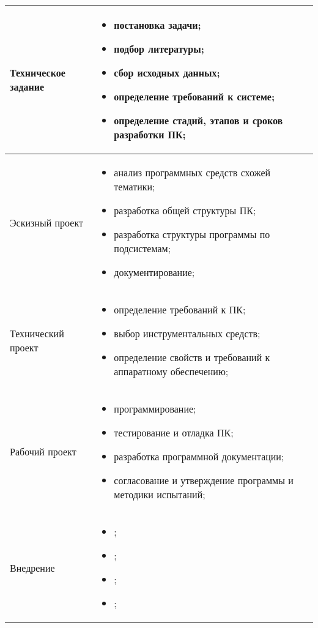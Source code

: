 \begin{center}
\begin{longtable}{|l|l|}
\hline
\endlastfoot
		Техническое задание & \begin{parbox}{5in} {
						\begin{itemize}
							\item постановка задачи;
							\item подбор литературы;
							\item сбор исходных данных;
							\item определение требований к системе;
							\item определение стадий, этапов и сроков разработки ПК;
						\end{itemize} }  
					\end{parbox} \\
	\hline
		Эскизный проект & \begin{parbox}{5in} {
					\begin{itemize} 
						\item анализ программных средств схожей тематики;
						\item разработка общей структуры ПК;
						\item разработка структуры программы по подсистемам;
						\item документирование;
					\end{itemize} }
				\end{parbox} \\
	\hline
		Технический проект & \begin{parbox}{5in} {
					\begin{itemize} 
						\item определение требований к ПК;
						\item выбор инструментальных средств;
						\item определение свойств и требований к аппаратному обеспечению;
					\end{itemize} } 
				\end{parbox} \\
	\hline
		Рабочий проект & \begin{parbox}{5in} {
					\begin{itemize} 
						\item программирование;
						\item тестирование и отладка ПК;
						\item разработка программной документации;
						\item согласование и утверждение программы и методики испытаний;
					\end{itemize} }
				\end{parbox} \\
	\hline
		Внедрение & \begin{parbox}{5in} {
					\begin{itemize}
						\item ;
						\item ;
						\item ;
						\item ;
					\end{itemize} }
				\end{parbox} \\
\end{longtable}
\end{center}


